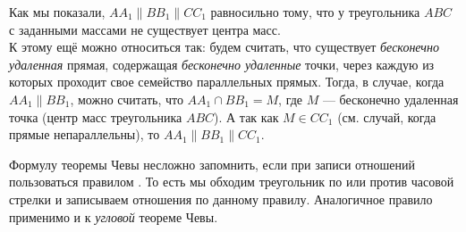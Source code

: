 \documentclass[14pt]{extarticle}
\theoremstyle{definition}
\theoremstyle{theorem}
\newtheorem*{remark}{\textup{Комментарий}}
\renewenvironment{remark}
    {\noindent\textbf{Комментарий.}}
\newenvironment{note}
    {\noindent {\normalfont\fontsize{14}{14}\textbf{\textit{Примечание.}}}}
\begin{document}
\begin{note}
Как мы показали,
\(AA_1 \parallel BB_1 \parallel CC_1\) равносильно тому, что у
треугольника \(ABC\) с заданными массами не существует центра масс.\\ 
К этому ещё можно относиться так: будем считать, что существует 
\textit{бесконечно удаленная} прямая, содержащая \textit{бесконечно удаленные}
точки, через каждую из которых проходит свое семейство параллельных прямых.
Тогда, в случае, когда  \(AA_1 \parallel BB_1\), можно считать, что
\(AA_1 \cap BB_1 = M\), где \(M\) --- бесконечно удаленная точка 
(центр масс треугольника \(ABC\)). А так как
\(M \in CC_1\) (см. случай, когда прямые непараллельны), 
то \(AA_1 \parallel BB_1 \parallel CC_1\).

Формулу теоремы Чевы несложно запомнить, если при записи отношений
пользоваться правилом .
То есть мы обходим треугольник по или против часовой стрелки и записываем
отношения по данному правилу. Аналогичное правило применимо и к \textit{угловой}
теореме Чевы.\\
\end{note}





\end{document}
